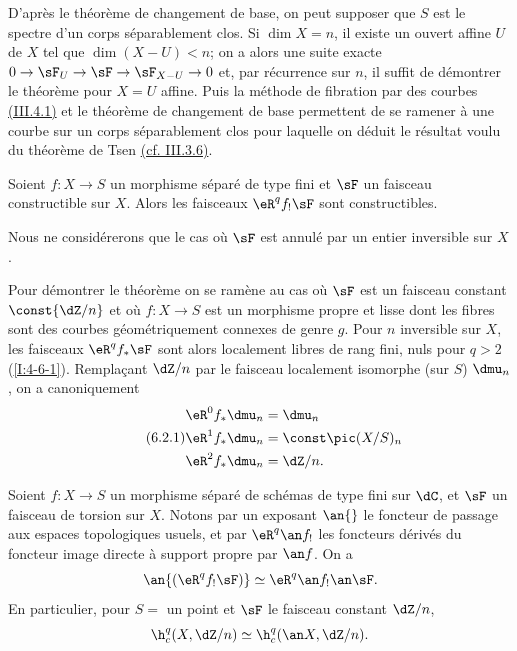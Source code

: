 D'après le théorème de changement de base, on peut supposer que $S$ est 
le spectre d'un corps séparablement clos. Si $\dim X = n$, il existe un 
ouvert affine $U$ de $X$ tel que $\dim(X-U) < n$; on a alors une suite 
exacte $0\to \sF_U \to \sF \to \sF_{X-U} \to 0$ et, par récurrence sur $n$, 
il suffit de démontrer le théorème pour $X=U$ affine. Puis la méthode de 
fibration par des courbes \hyperref[I:3-4-1]{(III.4.1)} et le théorème de changement de 
base permettent de se ramener à une courbe sur un corps séparablement clos 
pour laquelle on déduit le résultat voulu du théorème de Tsen 
\hyperref[I:3-3-6]{(cf. III.3.6)}. 





\begin{sourcenamedfirstdotdash}\label{I:4-6-2}
Soient $f:X\to S$ un morphisme séparé de type fini et $\sF$ un faisceau 
constructible sur $X$. Alors les faisceaux $\eR^q f_! \sF$ sont constructibles. 
\end{sourcenamedfirstdotdash}

Nous ne considérerons que le cas où $\sF$ est annulé par un entier inversible 
sur $X$. 

Pour démontrer le théorème on se ramène au cas où $\sF$ est un faisceau 
constant $\const{\dZ/n}$ et où $f:X\to S$ est un morphisme propre et lisse 
dont les fibres sont des courbes géométriquement connexes de genre $g$. 
Pour $n$ inversible sur $X$, les faisceaux $\eR^q f_* \sF$ sont alors localement 
libres de rang fini, nuls pour $q>2$ (\ref{I:4-6-1}). Remplaçant $\dZ/n$ par le 
faisceau localement isomorphe (sur $S$) $\dmu_n$, on a canoniquement 
\begingroup
\makeatletter
\tagsleft@true
\let\veqno\@@leqno
\makeatother
\begin{equation*}\tag{6.2.1}\label{I:eq:4-6-2-1}
\begin{aligned}
  \eR^0 f_* \dmu_n &= \dmu_n \\
  \eR^1 f_* \dmu_n &= \const\pic(X/S)_n \\
  \eR^2 f_* \dmu_n &= \dZ/n \text{.}
\end{aligned}
\end{equation*}
\endgroup





\begin{theoremdotdash}\label{I:4-6-3}
Soient $f:X\to S$ un morphisme séparé de schémas de type fini sur $\dC$, 
et $\sF$ un faisceau de torsion sur $X$. Notons par un exposant $\an{}$ le 
foncteur de passage aux espaces topologiques usuels, et par $\eR^q \an f_!$ les 
foncteurs dérivés du foncteur image directe à support propre par $\an f$. On a 
\[
  \an{(\eR^q f_! \sF)} \simeq \eR^q \an f_! \an \sF \text{.}
\]
En particulier, pour $S=$ un point et $\sF$ le faisceau constant $\dZ/n$, 
\[
  \h_c^q(X,\dZ/n) \simeq \h_c^q(\an X,\dZ/n)\text{.}
\]
\end{theoremdotdash}

